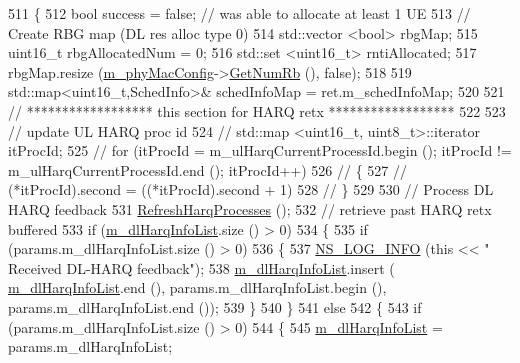 \begin{DoxyCode}
511 \{
512         \textcolor{keywordtype}{bool} success = \textcolor{keyword}{false}; \textcolor{comment}{// was able to allocate at least 1 UE}
513         \textcolor{comment}{// Create RBG map (DL res alloc type 0)}
514         std::vector <bool> rbgMap;
515         uint16\_t rbgAllocatedNum = 0;
516         std::set <uint16\_t> rntiAllocated;
517         rbgMap.resize (\hyperlink{classns3_1_1MmWaveMacScheduler_a24d7af4971d2e500fe543cefbafa2fd9}{m\_phyMacConfig}->\hyperlink{classns3_1_1MmWavePhyMacCommon_a4c5f323fd722d6eec52efda5d76f97ad}{GetNumRb} (), \textcolor{keyword}{false});
518 
519         std::map<uint16\_t,SchedInfo>& schedInfoMap = ret.m\_schedInfoMap;
520 
521         \textcolor{comment}{// ****************** this section for HARQ retx ******************}
522 
523         \textcolor{comment}{//   update UL HARQ proc id}
524 \textcolor{comment}{//      std::map <uint16\_t, uint8\_t>::iterator itProcId;}
525 \textcolor{comment}{//      for (itProcId = m\_ulHarqCurrentProcessId.begin (); itProcId != m\_ulHarqCurrentProcessId.end ();
       itProcId++)}
526 \textcolor{comment}{//      \{}
527 \textcolor{comment}{//              (*itProcId).second = ((*itProcId).second + 1) %
528 \textcolor{comment}{//      \}}
529 
530         \textcolor{comment}{// Process DL HARQ feedback}
531         \hyperlink{classns3_1_1MmWaveRrMacScheduler_a5b4fe59b80549148440a6e5f3e05f8e6}{RefreshHarqProcesses} ();
532         \textcolor{comment}{// retrieve past HARQ retx buffered}
533         \textcolor{keywordflow}{if} (\hyperlink{classns3_1_1MmWaveRrMacScheduler_a1b1043d7f9994e2ee6a7e1b368e9d7a1}{m\_dlHarqInfoList}.size () > 0)
534         \{
535                 \textcolor{keywordflow}{if} (params.m\_dlHarqInfoList.size () > 0)
536                 \{
537                         \hyperlink{group__logging_gafbd73ee2cf9f26b319f49086d8e860fb}{NS\_LOG\_INFO} (\textcolor{keyword}{this} << \textcolor{stringliteral}{" Received DL-HARQ feedback"});
538                         \hyperlink{classns3_1_1MmWaveRrMacScheduler_a1b1043d7f9994e2ee6a7e1b368e9d7a1}{m\_dlHarqInfoList}.insert (
      \hyperlink{classns3_1_1MmWaveRrMacScheduler_a1b1043d7f9994e2ee6a7e1b368e9d7a1}{m\_dlHarqInfoList}.end (), params.m\_dlHarqInfoList.begin (), params.m\_dlHarqInfoList.end ());
539                 \}
540         \}
541         \textcolor{keywordflow}{else}
542         \{
543                 \textcolor{keywordflow}{if} (params.m\_dlHarqInfoList.size () > 0)
544                 \{
545                         \hyperlink{classns3_1_1MmWaveRrMacScheduler_a1b1043d7f9994e2ee6a7e1b368e9d7a1}{m\_dlHarqInfoList} = params.m\_dlHarqInfoList;
}
\end{DoxyCode}
